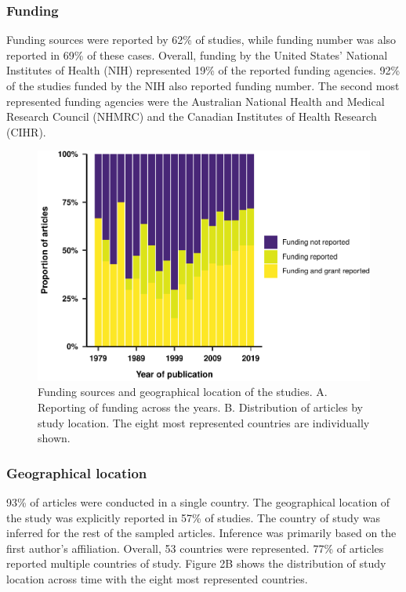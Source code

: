 \documentclass[
  english,
  jou,floatsintext]{apa6}
\begin{document}
\hypertarget{funding}{%
\subsubsection{Funding}\label{funding}}

Funding sources were reported by 62\% of studies, while funding number was also reported in 69\% of these cases. Overall, funding by the United States' National Institutes of Health (NIH) represented 19\% of the reported funding agencies. 92\% of the studies funded by the NIH also reported funding number. The second most represented funding agencies were the Australian National Health and Medical Research Council (NHMRC) and the Canadian Institutes of Health Research (CIHR).

\begin{figure}
\centering
\includegraphics{article_files/figure-latex/unnamed-chunk-3-1.pdf}
\caption{\label{fig:unnamed-chunk-3}Funding sources and geographical location of the studies. A. Reporting of funding across the years. B. Distribution of articles by study location. The eight most represented countries are individually shown.}
\end{figure}

\hypertarget{geographical-location}{%
\subsubsection{Geographical location}\label{geographical-location}}

93\% of articles were conducted in a single country. The geographical location of the study was explicitly reported in 57\% of studies. The country of study was inferred for the rest of the sampled articles. Inference was primarily based on the first author's affiliation. Overall, 53 countries were represented. 77\% of articles reported multiple countries of study. Figure 2B shows the distribution of study location across time with the eight most represented countries.
\end{document}
